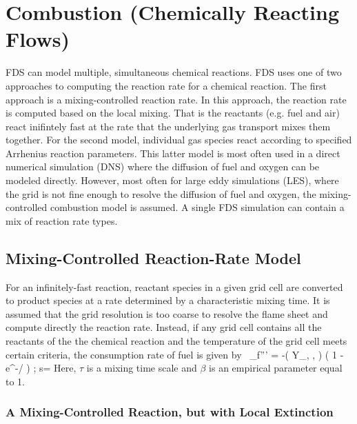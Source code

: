 \chapter{Combustion (Chemically Reacting Flows)}

\label{combustionsection}

FDS can model multiple, simultaneous chemical reactions.  FDS uses one of two approaches to computing the reaction rate for a chemical reaction.  The first approach is a mixing-controlled reaction rate.  In this approach, the reaction rate is computed based on the local mixing.  That is the reactants (e.g. fuel and air) react inifintely fast at the rate that the underlying gas transport mixes them together.  For the second model, individual gas species react according to
specified Arrhenius reaction parameters. This latter model is most often used in a
direct numerical simulation (DNS) where the diffusion of fuel and oxygen can be
modeled directly.
However, most often for large eddy simulations (LES), where the grid is not
fine enough to resolve the diffusion of fuel and oxygen,
the mixing-controlled combustion model is assumed.  A single FDS simulation can contain a mix of reaction rate types.

\section{Mixing-Controlled Reaction-Rate Model}

For an infinitely-fast reaction, reactant species in a given grid cell are converted to product species at a rate determined by a
characteristic mixing time.  It is assumed that the
grid resolution is too coarse to resolve the flame sheet and compute directly the reaction rate.  Instead, if any grid cell contains all the reactants of the the chemical reaction and the temperature of the grid cell meets certain criteria, the consumption rate of fuel is given by~\cite{Poinsot:TNC}
\be \dm_f''' = -\rho \min \left( Y_\F , , \beta {} \right) \; \left( 1 - e^{-\dt/\tau} \right)   \quad ; \quad
   s=  \label{EDC} \ee
Here, $\tau$ is a mixing time scale and $\beta$ is an empirical parameter equal to 1.

\subsection{A Mixing-Controlled Reaction, but with Local Extinction}

